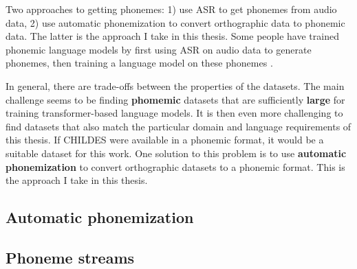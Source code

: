 

Two approaches to getting phonemes: 1) use ASR to get phonemes from audio data, 2) use automatic phonemization to convert orthographic data to phonemic data. The latter is the approach I take in this thesis.
Some people have trained phonemic language models by first using ASR on audio data to generate phonemes, then training a language model on these phonemes \citep{zissman1994automatic}.

In general, there are trade-offs between the properties of the datasets. The main challenge seems to be finding \textbf{phomemic} datasets that are sufficiently \textbf{large} for training transformer-based language models. It is then even more challenging to find datasets that also match the particular domain and language requirements of this thesis. If CHILDES were available in a phonemic format, it would be a suitable dataset for this work. One solution to this problem is to use \textbf{automatic phonemization} to convert orthographic datasets to a phonemic format. This is the approach I take in this thesis.

\subsection{Automatic phonemization}
\label{sec:dataset-phonemization}


\subsection{Phoneme streams}
\label{sec:dataset-phoneme-streams}


